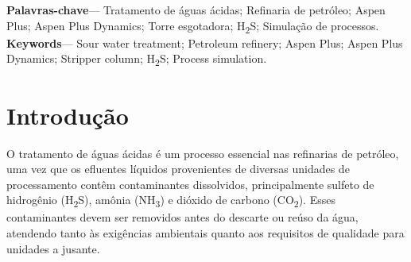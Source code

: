 \documentclass[10pt,a4paper]{article}
\begin{document}
\begin{abstract}
O tratamento de águas ácidas em refinarias de petróleo é um desafio crítico devido à necessidade de cumprir rigorosas restrições ambientais e garantir a eficiência operacional das unidades downstream, como as Unidades de Recuperação de Enxofre (URE). Este trabalho apresenta o desenvolvimento e análise de modelos estáticos e dinâmicos de uma Unidade de Tratamento de Águas Ácidas (UTAA) de duas torres, com foco particular na torre esgotadora de H\textsubscript{2}S. As simulações foram desenvolvidas utilizando Aspen Plus V14 e Aspen Plus Dynamics V14, abrangendo a seleção de modelos termodinâmicos, especificações de equipamentos e condições operacionais do processo. O comportamento do sistema foi investigado para diversas concentrações de contaminantes na alimentação, com ênfase na região de operação crítica próxima ao limite de fervura da coluna. O objetivo é compreender os trade-offs entre maximizar a recuperação de H\textsubscript{2}S no gás ácido, minimizar o teor de NH\textsubscript{3} para evitar deposição de sais de amônio na URE, e reduzir o consumo energético no refervedor. Os resultados fornecem subsídios para otimização operacional e estabelecem as bases para futuras estratégias de controle baseadas em modelo.
\end{abstract}

\vspace{1em}

\noindent\textbf{Palavras-chave}— Tratamento de águas ácidas; Refinaria de petróleo; Aspen Plus; Aspen Plus Dynamics; Torre esgotadora; H\textsubscript{2}S; Simulação de processos.\\
\noindent\textbf{Keywords}— Sour water treatment; Petroleum refinery; Aspen Plus; Aspen Plus Dynamics; Stripper column; H\textsubscript{2}S; Process simulation.


\vspace{2em}

\section{Introdução}\label{sec:introducao}
O tratamento de águas ácidas é um processo essencial nas refinarias de petróleo, uma vez que os efluentes líquidos provenientes de diversas unidades de processamento contêm contaminantes dissolvidos, principalmente sulfeto de hidrogênio (H\textsubscript{2}S), amônia (NH\textsubscript{3}) e dióxido de carbono (CO\textsubscript{2}). Esses contaminantes devem ser removidos antes do descarte ou reúso da água, atendendo tanto às exigências ambientais quanto aos requisitos de qualidade para unidades a jusante.
\end{document}
